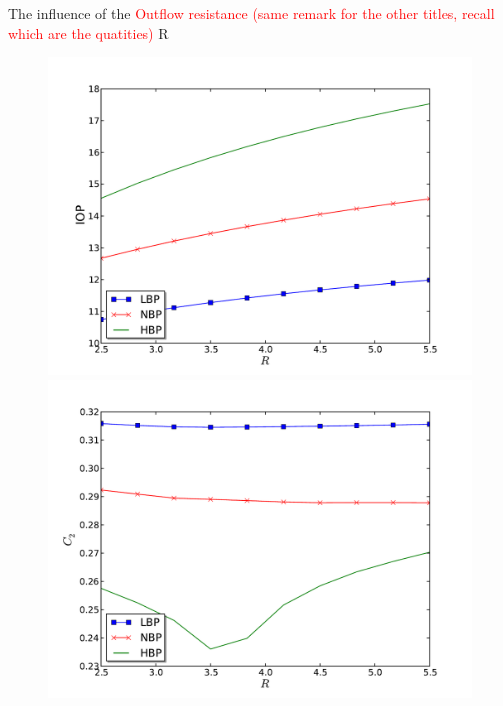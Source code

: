 \begin{frame}{The influence of the \textcolor{red}{Outflow resistance (same remark for the other titles, recall which are the quatities)} R}
\begin{figure}[H]
\begin{minipage}{0.45\linewidth}
\includegraphics[scale=0.27]{images/IOP_R}
\end{minipage}\hfill
\begin{minipage}{0.45\linewidth}
\includegraphics[scale=0.27]{images/C2_R}
\end{minipage}
\end{figure}
\end{frame}
